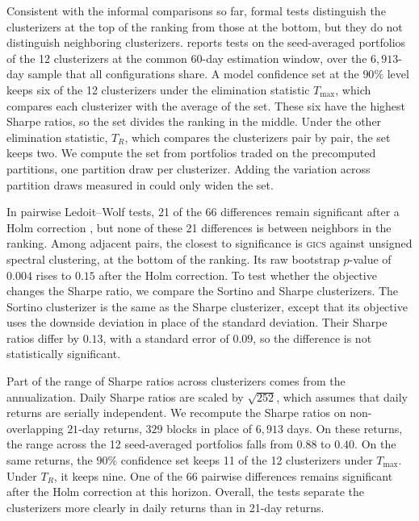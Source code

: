 Consistent with the informal comparisons so far, formal tests distinguish the clusterizers at the top of the ranking from those at the bottom, but they do not distinguish neighboring clusterizers.  reports tests on the seed-averaged portfolios of the 12 clusterizers at the common 60-day estimation window, over the $6{,}913$-day sample that all configurations share. A model confidence set at the $90\%$ level keeps six of the 12 clusterizers under the elimination statistic $T_{\max}$, which compares each clusterizer with the average of the set. These six have the highest Sharpe ratios, so the set divides the ranking in the middle. Under the other elimination statistic, $T_R$, which compares the clusterizers pair by pair, the set keeps two. We compute the set from portfolios traded on the precomputed partitions, one partition draw per clusterizer. Adding the variation across partition draws measured in  could only widen the set.

In pairwise Ledoit--Wolf tests, 21 of the 66 differences remain significant after a Holm correction \citep{holm1979simple}, but none of these 21 differences is between neighbors in the ranking. Among adjacent pairs, the closest to significance is \textsc{gics} against unsigned spectral clustering, at the bottom of the ranking. Its raw bootstrap $p$-value of $0.004$ rises to $0.15$ after the Holm correction. To test whether the objective changes the Sharpe ratio, we compare the Sortino and Sharpe clusterizers. The Sortino clusterizer is the same as the Sharpe clusterizer, except that its objective uses the downside deviation in place of the standard deviation. Their Sharpe ratios differ by $0.13$, with a standard error of $0.09$, so the difference is not statistically significant.

Part of the range of Sharpe ratios across clusterizers comes from the annualization. Daily Sharpe ratios are scaled by $\sqrt{252}$, which assumes that daily returns are serially independent. We recompute the Sharpe ratios on non-overlapping $21$-day returns, $329$ blocks in place of $6{,}913$ days. On these returns, the range across the 12 seed-averaged portfolios falls from $0.88$ to $0.40$. On the same returns, the $90\%$ confidence set keeps 11 of the 12 clusterizers under $T_{\max}$. Under $T_R$, it keeps nine. One of the 66 pairwise differences remains significant after the Holm correction at this horizon. Overall, the tests separate the clusterizers more clearly in daily returns than in 21-day returns.

